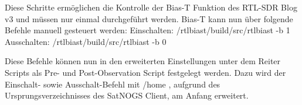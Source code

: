 Diese Schritte ermöglichen die Kontrolle der Bias-T Funktion des RTL-SDR Blog v3 und müssen nur einmal durchgeführt werden. Bias-T kann nun über folgende Befehle manuell gesteuert werden:
\newline Einschalten: \glqq /rtl\textunderscore biast/build/src/rtl\textunderscore biast -b 1\grqq{}
\newline Ausschalten: \glqq /rtl\textunderscore biast/build/src/rtl\textunderscore biast -b 0\grqq{}

Diese Befehle können nun in den erweiterten Einstellungen unter dem Reiter Scripts als Pre- und Post-Observation Script festgelegt werden. Dazu wird der Einschalt- sowie Ausschalt-Befehl mit \glqq /home\grqq{} , aufgrund des Ursprungsverzeichnisses des SatNOGS Client, am Anfang erweitert.